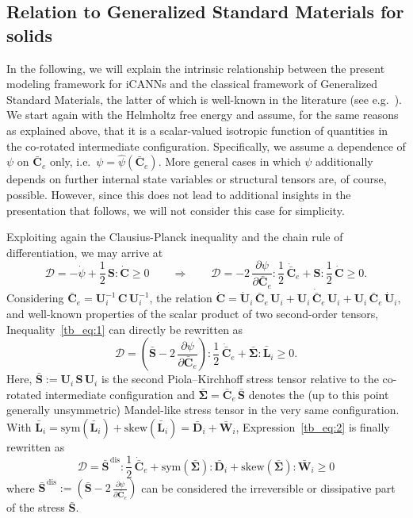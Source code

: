 \subsection{Relation to Generalized Standard Materials for solids}
\label{sec:GSM}
In the following, we will explain the intrinsic relationship between the present modeling framework for iCANNs and the classical framework of Generalized Standard Materials, the latter of which is well-known in the literature (see e.g.\ \cite{halphen1975,germain1983,flaschel2023}). We start again with the Helmholtz free energy and assume, for the same reasons as explained above, that it is a scalar-valued isotropic function of quantities in the co-rotated intermediate configuration. Specifically, we assume a dependence of $\psi$ on $\bar{\bm{C}}_e$ only, i.e.\ $\psi = \hat{\psi}(\bar{\bm{C}}_e)$. More general cases in which $\psi$ additionally depends on further internal state variables or structural tensors are, of course, possible. However, since this does not lead to additional insights in the presentation that follows, we will not consider this case for simplicity.

Exploiting again the Clausius-Planck inequality and the chain rule of differentiation, we may arrive at
\begin{equation}
\label{tb_eq:1}
\mathcal{D} = -\dot{\psi} + \frac{1}{2}\, \bm{S}:\dot{\bm{C}} \geq 0 \qquad \Rightarrow \qquad \mathcal{D} = -2\,\frac{\partial \psi}{\partial \bar{\bm{C}}_e} : \frac{1}{2}\,\dot{\bar{\bm{C}}}_e + \bm{S}:\frac{1}{2}\,\dot{\bm{C}} \geq 0.
\end{equation}
Considering $\bar{\bm{C}}_e = \bm{U}_i^{-1}\,\bm{C}\,\bm{U}_i^{-1}$, the relation $\dot{\bm{C}} = \dot{\bm{U}}_i\,\bar{\bm{C}}_e\,\bm{U}_i + \bm{U}_i\,\dot{\bar{\bm{C}}}_e\,\bm{U}_i + \bm{U}_i\,\bar{\bm{C}}_e\,\dot{\bm{U}}_i$, and well-known properties of the scalar product of two second-order tensors, Inequality~\eqref{tb_eq:1} can directly be rewritten as
\begin{equation}
\label{tb_eq:2}
\mathcal{D} = \left(\bar{\bm{S}} - 2\,\frac{\partial \psi}{\partial \bar{\bm{C}}_e}\right):\frac{1}{2}\,\dot{\bar{\bm{C}}}_e + \bar{\bm{\Sigma}}:\bar{\bm{L}}_i \geq 0.
\end{equation}
Here, $\bar{\bm{S}} := \bm{U}_i\,\bm{S}\,\bm{U}_i$ is the second Piola–Kirchhoff stress tensor relative to the co-rotated intermediate configuration and $\bar{\bm{\Sigma}} = \bar{\bm{C}}_e\,\bar{\bm{S}}$ denotes the (up to this point generally unsymmetric) Mandel-like stress tensor in the very same configuration. With $\bar{\bm{L}}_i = \mathrm{sym}(\bar{\bm{L}}_i) + \mathrm{skew}(\bar{\bm{L}}_i) = \bar{\bm{D}}_i + \bar{\bm{W}}_i$, Expression~\eqref{tb_eq:2} is finally rewritten as
\begin{equation}
\label{tb_eq:3}
\mathcal{D} = \bar{\bm{S}}^{\,\mathrm{dis}}:\frac{1}{2}\,\dot{\bar{\bm{C}}}_e + \mathrm{sym}(\bar{\bm{\Sigma}}):\bar{\bm{D}}_i + \mathrm{skew}(\bar{\bm{\Sigma}}):\bar{\bm{W}}_i \geq 0
\end{equation}
where $\bar{\bm{S}}^{\,\mathrm{dis}} := \left(\bar{\bm{S}} - 2\,\frac{\partial \psi}{\partial \bar{\bm{C}}_e}\right)$ can be considered the irreversible or dissipative part of the stress $\bar{\bm{S}}$.

